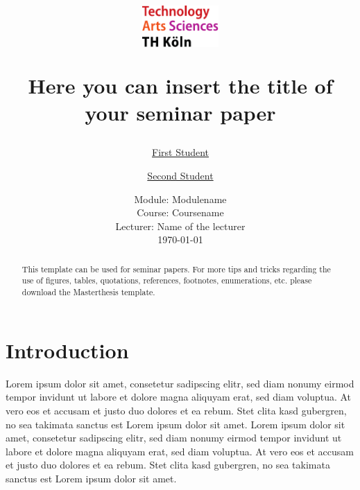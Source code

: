 \documentclass[a4paper]{article}
\begin{document}
	\title{
	\begin{figure}[!ht]
			\includegraphics[width=0.26\textwidth]{img/THlogoheader.pdf}
	\end{figure}
	\vspace{1cm}
	\Huge Here you can insert the title of \\ your seminar paper \\
	}
	
	\vspace{1cm}
	
	
	\author{\Large \href{mailto:first.student@smail.th-koeln.de}{First Student} \and \Large \href{mailto:second.student@smail.th-koeln.de}{Second Student}
	\vspace{1cm}}
	
	\date{
	\large Module: Modulename \\ Course: Coursename \\ 
	\vspace{0.8cm}
	\large Lecturer: Name of the lecturer \\
	\vspace{1cm}
	\today
	}

	\maketitle
	\setlength{\parindent}{0pt}

\vspace{2cm}
\begin{abstract}
This template can be used for seminar papers. For more tips and tricks regarding the use of figures, tables, quotations, references, footnotes, enumerations, etc. please download the Masterthesis template. 

\end{abstract}
	\newpage
	\tableofcontents
	\newpage
	

\section{Introduction} %
\label{sec:introduction}
Lorem ipsum dolor sit amet, consetetur sadipscing elitr, sed diam nonumy eirmod tempor invidunt ut labore et dolore magna aliquyam erat, sed diam voluptua. \citep{Stanford09} At vero eos et accusam et justo duo dolores et ea rebum. Stet clita kasd gubergren, no sea takimata sanctus est Lorem ipsum dolor sit amet. Lorem ipsum dolor sit amet, consetetur sadipscing elitr, sed diam nonumy eirmod tempor invidunt ut labore et dolore magna aliquyam erat, sed diam voluptua. At vero eos et accusam et justo duo dolores et ea rebum. Stet clita kasd gubergren, no sea takimata sanctus est Lorem ipsum dolor sit amet.
\end{document}
